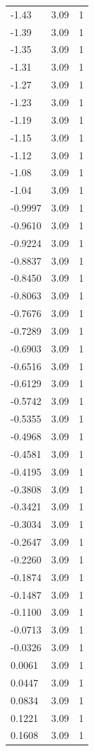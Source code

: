 \begin{longtable}{lrr}
  -1.43 & 3.09 & 1 \\
  -1.39 & 3.09 & 1 \\
  -1.35 & 3.09 & 1 \\
  -1.31 & 3.09 & 1 \\
  -1.27 & 3.09 & 1 \\
  -1.23 & 3.09 & 1 \\
  -1.19 & 3.09 & 1 \\
  -1.15 & 3.09 & 1 \\
  -1.12 & 3.09 & 1 \\
  -1.08 & 3.09 & 1 \\
  -1.04 & 3.09 & 1 \\
  -0.9997 & 3.09 & 1 \\
  -0.9610 & 3.09 & 1 \\
  -0.9224 & 3.09 & 1 \\
  -0.8837 & 3.09 & 1 \\
  -0.8450 & 3.09 & 1 \\
  -0.8063 & 3.09 & 1 \\
  -0.7676 & 3.09 & 1 \\
  -0.7289 & 3.09 & 1 \\
  -0.6903 & 3.09 & 1 \\
  -0.6516 & 3.09 & 1 \\
  -0.6129 & 3.09 & 1 \\
  -0.5742 & 3.09 & 1 \\
  -0.5355 & 3.09 & 1 \\
  -0.4968 & 3.09 & 1 \\
  -0.4581 & 3.09 & 1 \\
  -0.4195 & 3.09 & 1 \\
  -0.3808 & 3.09 & 1 \\
  -0.3421 & 3.09 & 1 \\
  -0.3034 & 3.09 & 1 \\
  -0.2647 & 3.09 & 1 \\
  -0.2260 & 3.09 & 1 \\
  -0.1874 & 3.09 & 1 \\
  -0.1487 & 3.09 & 1 \\
  -0.1100 & 3.09 & 1 \\
  -0.0713 & 3.09 & 1 \\
  -0.0326 & 3.09 & 1 \\
  0.0061 & 3.09 & 1 \\
  0.0447 & 3.09 & 1 \\
  0.0834 & 3.09 & 1 \\
  0.1221 & 3.09 & 1 \\
  0.1608 & 3.09 & 1 \\

\end{longtable}
